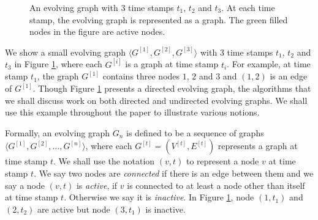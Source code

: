 \documentclass[11pt,conference,compsocconf]{IEEEtran}
\theoremstyle{definition}
\begin{document}
\begin{figure}[h]
 \begin{center}
\end{center}
\caption{An evolving graph with 3 time stamps $t_1$, $t_2$ and $t_3$.
At each time stamp, the evolving graph is represented as a graph.
The green filled nodes in the figure are active nodes.}
\label{fig:eg_shortest_path}
\end{figure}

We show a small evolving graph $ \langle G^{[1]}, G^{[2]}, G^{[3]}\rangle$ with $3$ time stamps $t_1$, $t_2$ and $t_3$
in Figure \ref{fig:eg_shortest_path}, where each $G^{[i]}$ is a graph at time stamp $t_i$.
For example,
at time stamp $t_1$, the graph $G^{[1]}$ contains three nodes $1$, $2$ and $3$ and $(1,2)$ is an edge of $G^{[1]}$.
Though Figure \ref{fig:eg_shortest_path} presents a
directed evolving graph,  the algorithms that we shall discuss work on both
directed and undirected evolving graphs.
We shall use this example throughout the paper to illustrate various
notions.

Formally, an evolving graph $G_n $ is defined to be a sequence of graphs $\langle G^{[1]}, G^{[2]}, \ldots, G^{[n]}\rangle$,  where each $G^{[t]} = (V^{[t]}, E^{[t]})$ represents a graph at time stamp $t$.
We shall use the notation $(v, t)$ to represent
a node $v$ at time stamp $t$.
We say two nodes are \emph{connected} if there is an edge between them
and we say a node $(v,t)$ is \emph{active}, if $v$ is connected to at least a node other than itself at time stamp $t$. Otherwise we say it is \emph{inactive}.
In Figure \ref{fig:eg_shortest_path}, node $(1,t_1)$ and $(2,t_2)$  are active but node $(3,t_1)$ is inactive.
\end{document}

